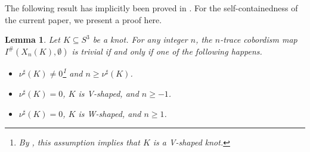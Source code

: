 \documentclass[11pt]{amsart}
\newtheorem{lemma}[theorem]{Lemma}
\begin{document}
The following result has implicitly been proved in \cite{baldwin2020concordance}. For the self-containedness of the current paper, we present a proof here.
\begin{lemma}\label{trace_trivial}
	Let $K\subseteq S^3$ be a knot. For any integer $n$, the $n$-trace cobordism map $I^{\#}(X_n(K), \emptyset)$ is trivial if and only if one of the following happens.
\begin{itemize}
\item [(1)] $\nu^{\sharp}(K)\neq 0$\footnote{By \cite{baldwin2020concordance}, this assumption implies that $K$ is a V-shaped knot.} and $n\geq \nu^{\sharp}(K)$.
\item [(2)] $\nu^{\sharp}(K) = 0$, $K$ is V-shaped, and $n\geq -1$.
\item [(3)]\label{3} $\nu^{\sharp}(K) = 0$, $K$ is W-shaped, and $n\geq 1$.
\end{itemize}
\end{lemma}
\end{document}
